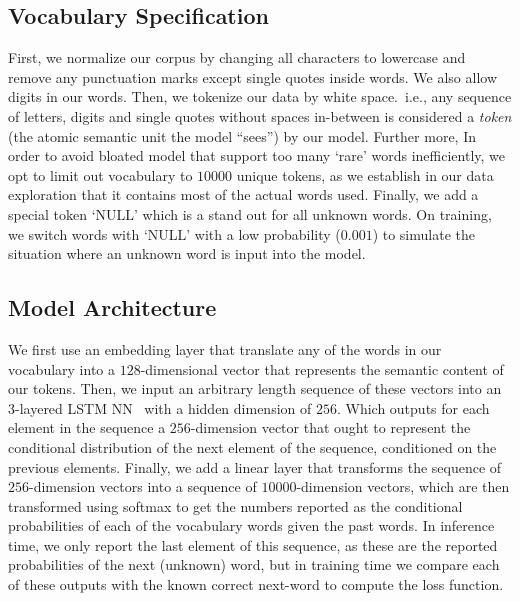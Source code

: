 \documentclass{article}
\theoremstyle{plain}
\theoremstyle{definition}
\theoremstyle{definition}
\theoremstyle{remark}
\begin{document}
\subsection{Vocabulary Specification}
First, we normalize our corpus by changing all characters to lowercase and remove any punctuation marks except single quotes inside words. We also allow digits in our words. Then, we tokenize our data by white space.\ i.e., any sequence of letters, digits and single quotes without spaces in-between is considered a \emph{token} (the atomic semantic unit the model ``sees'') by our model. Further more, 
In order to avoid bloated model that support too many `rare' words inefficiently, we opt to limit out vocabulary to \(10000\) unique tokens, as we establish in our data exploration that it contains most of the actual words used. Finally, we add a special token `NULL' which is a stand out for all unknown words. On training, we switch words with `NULL' with a low probability (\(0.001\)) to simulate the situation where an unknown word is input into the model.

\subsection{Model Architecture}
We first use an embedding layer that translate any of the words in our vocabulary into a \(128\)-dimensional vector that represents the semantic content of our tokens. Then, we input an arbitrary length sequence of these vectors into an 3-layered LSTM NN~\cite{LSTM} with a hidden dimension of \(256\). Which outputs for each element in the sequence a \(256\)-dimension vector that ought to represent the conditional distribution of the next element of the sequence, conditioned on the previous elements.
Finally, we add a linear layer that transforms the sequence of \(256\)-dimension vectors into a sequence of \(10000\)-dimension vectors, which are then transformed using softmax to get the numbers reported as the conditional probabilities of each of the vocabulary words given the past words. In inference time, we only report the last element of this sequence, as these are the reported probabilities of the next (unknown) word, but in training time we compare each of these outputs
with the known correct next-word to compute the loss function.
\end{document}
